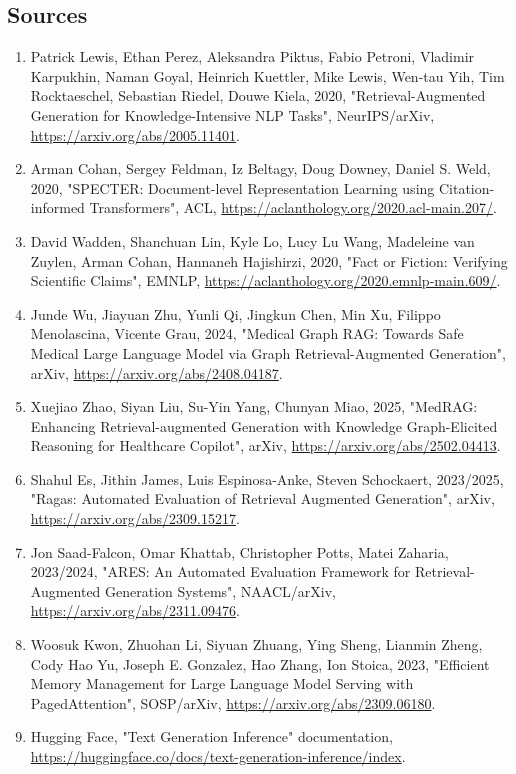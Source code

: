 \documentclass[11pt]{report}
\begin{document}
\subsection{Sources}
\begin{enumerate}
\item Patrick Lewis, Ethan Perez, Aleksandra Piktus, Fabio Petroni, Vladimir Karpukhin, Naman Goyal, Heinrich Kuettler, Mike Lewis, Wen-tau Yih, Tim Rocktaeschel, Sebastian Riedel, Douwe Kiela, 2020, "Retrieval-Augmented Generation for Knowledge-Intensive NLP Tasks", NeurIPS/arXiv, \url{https://arxiv.org/abs/2005.11401}.
\item Arman Cohan, Sergey Feldman, Iz Beltagy, Doug Downey, Daniel S. Weld, 2020, "SPECTER: Document-level Representation Learning using Citation-informed Transformers", ACL, \url{https://aclanthology.org/2020.acl-main.207/}.
\item David Wadden, Shanchuan Lin, Kyle Lo, Lucy Lu Wang, Madeleine van Zuylen, Arman Cohan, Hannaneh Hajishirzi, 2020, "Fact or Fiction: Verifying Scientific Claims", EMNLP, \url{https://aclanthology.org/2020.emnlp-main.609/}.
\item Junde Wu, Jiayuan Zhu, Yunli Qi, Jingkun Chen, Min Xu, Filippo Menolascina, Vicente Grau, 2024, "Medical Graph RAG: Towards Safe Medical Large Language Model via Graph Retrieval-Augmented Generation", arXiv, \url{https://arxiv.org/abs/2408.04187}.
\item Xuejiao Zhao, Siyan Liu, Su-Yin Yang, Chunyan Miao, 2025, "MedRAG: Enhancing Retrieval-augmented Generation with Knowledge Graph-Elicited Reasoning for Healthcare Copilot", arXiv, \url{https://arxiv.org/abs/2502.04413}.
\item Shahul Es, Jithin James, Luis Espinosa-Anke, Steven Schockaert, 2023/2025, "Ragas: Automated Evaluation of Retrieval Augmented Generation", arXiv, \url{https://arxiv.org/abs/2309.15217}.
\item Jon Saad-Falcon, Omar Khattab, Christopher Potts, Matei Zaharia, 2023/2024, "ARES: An Automated Evaluation Framework for Retrieval-Augmented Generation Systems", NAACL/arXiv, \url{https://arxiv.org/abs/2311.09476}.
\item Woosuk Kwon, Zhuohan Li, Siyuan Zhuang, Ying Sheng, Lianmin Zheng, Cody Hao Yu, Joseph E. Gonzalez, Hao Zhang, Ion Stoica, 2023, "Efficient Memory Management for Large Language Model Serving with PagedAttention", SOSP/arXiv, \url{https://arxiv.org/abs/2309.06180}.
\item Hugging Face, "Text Generation Inference" documentation, \url{https://huggingface.co/docs/text-generation-inference/index}.

\end{enumerate}
\end{document}
